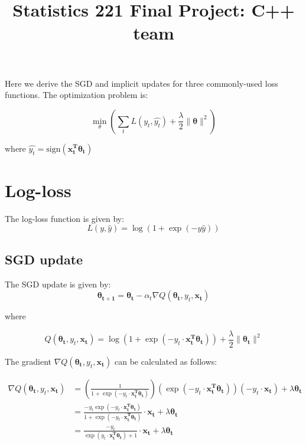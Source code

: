 \documentclass{article}
\title{Statistics 221 Final Project: C++ team}
\renewcommand{\vec}[1]{\boldsymbol{#1}}
\begin{document}
\maketitle

Here we derive the SGD and implicit updates for three commonly-used loss functions. The optimization problem is:

\begin{equation}
\min_{\theta}\left( \sum_{t} L(y_t, \hat{y_t}) + \frac{\lambda}{2}\|\vec{\theta}\|^2\right)
\end{equation}

where $\hat{y_t} = \textrm{sign}(\vec{x_t^{T}}\vec{\theta_t})$

\section{Log-loss}
The log-loss function is given by:
\begin{equation}
L(y, \hat{y}) = \log(1+\exp(-y\hat{y}))
\end{equation}

\subsection{SGD update}
The SGD update is given by:
\begin{equation}
\vec{\theta_{t+1}} = \vec{\theta_{t}} - \alpha_{t}\nabla Q(\vec{\theta_{t}}, y_t, \vec{x_t})
\end{equation}

where

\begin{equation}
Q(\vec{\theta_{t}}, y_t, \vec{x_t}) = \log\left(1+\exp(-y_t\cdot\vec{x_t^{T}}\vec{\theta_t})\right) + \frac{\lambda}{2}\|\vec{\theta_t}\|^2
\end{equation}

The gradient $\nabla Q(\vec{\theta_{t}}, y_t, \vec{x_t})$ can be calculated as follows:

\begin{align*}
\nabla Q(\vec{\theta_{t}}, y_t, \vec{x_t}) &= \left(\frac{1}{1+\exp(-y_t\cdot\vec{x_t^{T}}\vec{\theta_t})} \right)\left(\exp(-y_t\cdot\vec{x_t^{T}}\vec{\theta_t})\right)\left(-y_t\cdot\vec{x_t}\right) + \lambda\vec{\theta_t}\\
&= \frac{-y_t\exp(-y_t\cdot\vec{x_t^{T}}\vec{\theta_t})}{1+\exp(-y_t\cdot\vec{x_t^{T}}\vec{\theta_t})}\cdot\vec{x_t} + \lambda\vec{\theta_t}\\
&= \frac{-y_t}{\exp(y_t\cdot\vec{x_t^{T}}\vec{\theta_t})+1}\cdot\vec{x_t} + \lambda\vec{\theta_t}
\end{align*}
\end{document}
